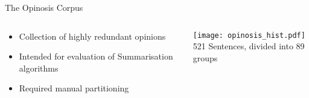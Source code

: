 \documentclass[12pt,landscape,english]{beamer}
\begin{document}
\begin{frame}{The Opinosis Corpus}
	\begin{columns}
		\begin{column}{0.5\textwidth}
			\begin{itemize}
				\item Collection of highly redundant opinions
				\item Intended for evaluation of Summarisation algorithms
				\item Required manual partitioning
			\end{itemize}
		\end{column}
		\begin{column}{0.5\textwidth}
			\texttt{[image: opinosis\_hist.pdf]}\\
			521 Sentences, divided into 89 groups
		\end{column}
	\end{columns}
	
\end{frame}
\end{document}
